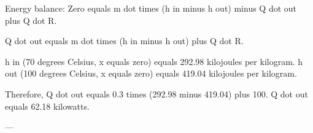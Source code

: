 Energy balance:  
Zero equals m dot times (h in minus h out) minus Q dot out plus Q dot R.  

Q dot out equals m dot times (h in minus h out) plus Q dot R.  

h in (70 degrees Celsius, x equals zero) equals 292.98 kilojoules per kilogram.  
h out (100 degrees Celsius, x equals zero) equals 419.04 kilojoules per kilogram.  

Therefore, Q dot out equals 0.3 times (292.98 minus 419.04) plus 100.  
Q dot out equals 62.18 kilowatts.  

---
